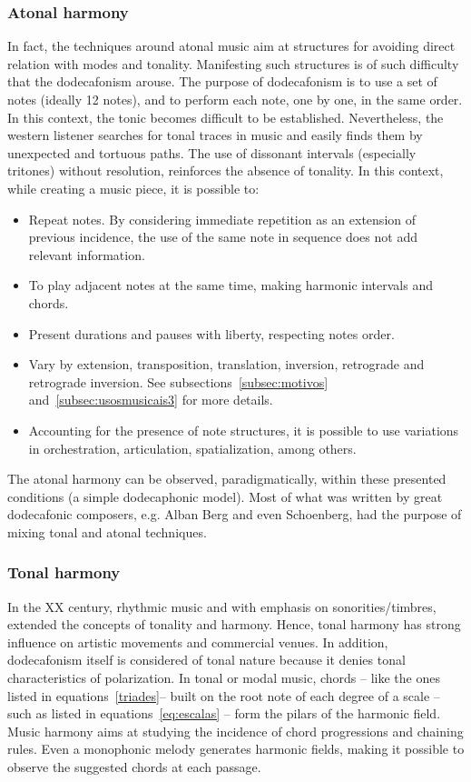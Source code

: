 \subsubsection{Atonal harmony}

In fact, the techniques around atonal music aim at structures for avoiding direct relation with modes and tonality. Manifesting such structures is of such difficulty that the dodecafonism arouse. The purpose of dodecafonism is to use a set of notes (ideally 12 notes), and to perform each note, one by one, in the same
order. In this context, the tonic becomes difficult to be established. Nevertheless, the western listener searches for tonal traces in music and easily finds them by unexpected and tortuous paths. The use of dissonant intervals (especially tritones) without resolution, reinforces the absence of tonality. In this context, while creating a music
piece, it is possible to:

\begin{itemize}
     \item Repeat notes. By considering immediate repetition as an extension of previous incidence, the use of the same note in sequence does not add relevant information.
     \item To play adjacent notes at the same time, making harmonic intervals and chords.
     \item Present durations and pauses with liberty, respecting notes order.
     \item Vary by extension, transposition, translation, inversion, retrograde and retrograde inversion. See subsections~\ref{subsec:motivos}
     and~\ref{subsec:usosmusicais3} for more details.
     \item Accounting for the presence of note structures, it is possible to use variations in orchestration, articulation, spatialization, among others.
\end{itemize}

The atonal harmony can be observed, paradigmatically, within these presented conditions (a simple dodecaphonic model). Most of what was written by great dodecafonic composers, 
e.g. Alban Berg and even Schoenberg, had the purpose of mixing tonal and atonal techniques.

\subsubsection{Tonal harmony}

In the XX century, rhythmic music and with emphasis on sonorities/timbres, extended the concepts of tonality and harmony. Hence, tonal harmony has strong influence on artistic movements and commercial venues. In addition, dodecafonism itself is considered of tonal nature because it denies tonal characteristics of polarization.
In tonal or modal music, chords -- like the ones listed in
equations~\ref{triades}-- built on the root note of each degree of a scale  -- such as listed in equations~\ref{eq:escalas} --  form the pilars of the harmonic field. Music harmony aims at studying the incidence of chord progressions and chaining rules. 
Even a monophonic melody generates harmonic fields, making it possible to observe the suggested chords at each passage.

